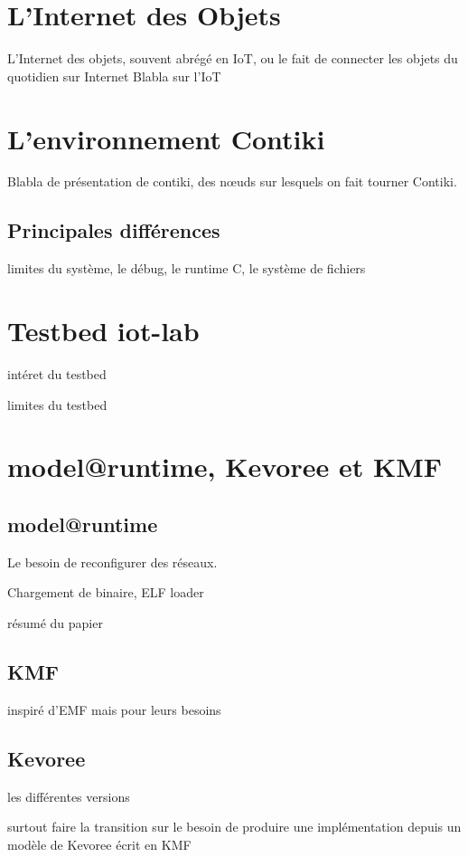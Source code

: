 \section{L'Internet des Objets}

L'Internet des objets, souvent abrégé en IoT, ou le fait de connecter les objets du quotidien sur Internet  
Blabla sur l'IoT

\section{L'environnement Contiki}

Blabla de présentation de contiki, des nœuds sur lesquels on fait tourner Contiki.

\subsection{Principales différences}

limites du système, le débug, le runtime C, le système de fichiers


\section{Testbed iot-lab}

intéret du testbed

limites du testbed

\section{model@runtime, Kevoree et KMF}

\subsection{model@runtime}

Le besoin de reconfigurer des réseaux.

Chargement de binaire, ELF loader

résumé du papier

\subsection{KMF}

inspiré d'EMF mais pour leurs besoins

\subsection{Kevoree}

les différentes versions

surtout faire la transition sur le besoin de produire une implémentation depuis un modèle de Kevoree écrit en KMF